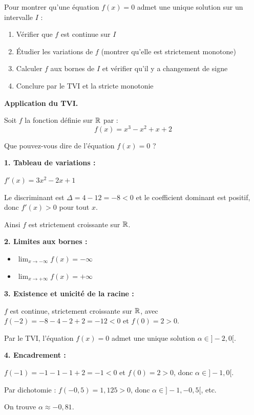 \documentclass[../PolyS2.tex]{subfiles}
\begin{document}
\newpage 

\begin{Meth}
Pour montrer qu'une équation $f(x) = 0$ admet une unique solution sur un intervalle $I$ :
\begin{enumerate}
    \item Vérifier que $f$ est continue sur $I$
    \item Étudier les variations de $f$ (montrer qu'elle est strictement monotone)
    \item Calculer $f$ aux bornes de $I$ et vérifier qu'il y a changement de signe
    \item Conclure par le TVI et la stricte monotonie
\end{enumerate}
\end{Meth}

\begin{Ex}
\textbf{Application du TVI.}

Soit $f$ la fonction définie sur $\mathbb{R}$ par :
$$f(x) = x^3 - x^2 + x + 2$$

Que pouvez-vous dire de l'équation $f(x) = 0$ ?

\vspace{1em}

\textbf{1. Tableau de variations :}

$f'(x) = 3x^2 - 2x + 1$

Le discriminant est $\Delta = 4 - 12 = -8 < 0$ et le coefficient dominant est positif, donc $f'(x) > 0$ pour tout $x$.

Ainsi $f$ est strictement croissante sur $\mathbb{R}$.

\vspace{1em}

\textbf{2. Limites aux bornes :}
\begin{itemize}
    \item $\displaystyle\lim_{x \to -\infty} f(x) = -\infty$
    \item $\displaystyle\lim_{x \to +\infty} f(x) = +\infty$
\end{itemize}

\vspace{1em}

\textbf{3. Existence et unicité de la racine :}

$f$ est continue, strictement croissante sur $\mathbb{R}$, avec $f(-2) = -8 - 4 - 2 + 2 = -12 < 0$ et $f(0) = 2 > 0$.

Par le TVI, l'équation $f(x) = 0$ admet une unique solution $\alpha \in ]-2, 0[$.

\vspace{1em}

\textbf{4. Encadrement :}

$f(-1) = -1 - 1 - 1 + 2 = -1 < 0$ et $f(0) = 2 > 0$, donc $\alpha \in ]-1, 0[$.

Par dichotomie : $f(-0{,}5) = 1{,}125 > 0$, donc $\alpha \in ]-1, -0{,}5[$, etc.

On trouve $\alpha \approx -0{,}81$.
\end{Ex}
\end{document}
